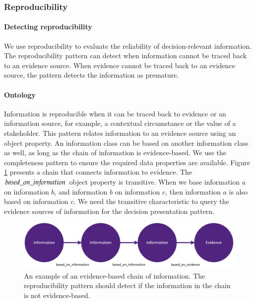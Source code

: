 \subsubsection{Reproducibility} \label{odp_reproducibility}
\paragraph{Detecting reproducibility}
We use reproducibility to evaluate the reliability of decision-relevant information. The reproducibility pattern can detect when information cannot be traced back to an evidence source. When evidence cannot be traced back to an evidence source, the pattern detects the information as premature. 

\begin{center}
\large\color{document}{The reproducibility pattern validates the information reliability by detecting when information cannot be traced back to an evidence source.}
\end{center}

\paragraph{Ontology}
Information is reproducible when it can be traced back to evidence or an information source, for example, a contextual circumstance or the value of a stakeholder. This pattern relates information to an evidence source using an object property. An information class can be based on another information class as well, as long as the chain of information is evidence-based. We use the completeness pattern to ensure the required data properties are available. Figure \ref{fig:reproducibility_chain} presents a chain that connects information to evidence. The $based\_on\_in{\mkern-2mu f\mkern-3mu}ormation$ object property is transitive. When we base information $a$ on information $b$, and information $b$ on information $c$, then information $a$ is also based on information $c$. We need the transitive characteristic to query the evidence sources of information for the decision presentation pattern.

\begin{figure}[H]
\centering
  \includegraphics[width=13cm]{../../Images/Reproducibility_Chain.png}
  \caption{An example of an evidence-based chain of information. The reproducibility pattern should detect if the information in the chain is not evidence-based.}
  \label{fig:reproducibility_chain}
\end{figure} 

